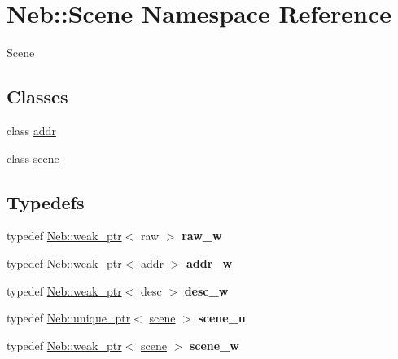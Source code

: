 \hypertarget{namespaceNeb_1_1Scene}{\section{\-Neb\-:\-:\-Scene \-Namespace \-Reference}
\label{namespaceNeb_1_1Scene}
}


\-Scene  


\subsection*{\-Classes}
\begin{DoxyCompactItemize}
\item 
class \hyperlink{classNeb_1_1Scene_1_1addr}{addr}
\item 
class \hyperlink{classNeb_1_1Scene_1_1scene}{scene}
\end{DoxyCompactItemize}
\subsection*{\-Typedefs}
\begin{DoxyCompactItemize}
\item 
\hypertarget{namespaceNeb_1_1Scene_a491202782a08cfdc79d32cef24cb0251}{typedef \hyperlink{classNeb_1_1weak__ptr}{\-Neb\-::weak\-\_\-ptr}$<$ raw $>$ {\bfseries raw\-\_\-w}}\label{namespaceNeb_1_1Scene_a491202782a08cfdc79d32cef24cb0251}

\item 
\hypertarget{namespaceNeb_1_1Scene_ac9472568202549f7c39e43599fa6dde1}{typedef \hyperlink{classNeb_1_1weak__ptr}{\-Neb\-::weak\-\_\-ptr}$<$ \hyperlink{classNeb_1_1Scene_1_1addr}{addr} $>$ {\bfseries addr\-\_\-w}}\label{namespaceNeb_1_1Scene_ac9472568202549f7c39e43599fa6dde1}

\item 
\hypertarget{namespaceNeb_1_1Scene_aff0eec7abe12304fff16b8dfca022f66}{typedef \hyperlink{classNeb_1_1weak__ptr}{\-Neb\-::weak\-\_\-ptr}$<$ desc $>$ {\bfseries desc\-\_\-w}}\label{namespaceNeb_1_1Scene_aff0eec7abe12304fff16b8dfca022f66}

\item 
\hypertarget{namespaceNeb_1_1Scene_a22af497e9e7ae086a75a14a114d5b5bb}{typedef \hyperlink{classNeb_1_1unique__ptr}{\-Neb\-::unique\-\_\-ptr}$<$ \hyperlink{classNeb_1_1Scene_1_1scene}{scene} $>$ {\bfseries scene\-\_\-u}}\label{namespaceNeb_1_1Scene_a22af497e9e7ae086a75a14a114d5b5bb}

\item 
\hypertarget{namespaceNeb_1_1Scene_a681793a7893bf30dc0677b7faf293ddb}{typedef \hyperlink{classNeb_1_1weak__ptr}{\-Neb\-::weak\-\_\-ptr}$<$ \hyperlink{classNeb_1_1Scene_1_1scene}{scene} $>$ {\bfseries scene\-\_\-w}}\label{namespaceNeb_1_1Scene_a681793a7893bf30dc0677b7faf293ddb}

\end{DoxyCompactItemize}
